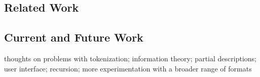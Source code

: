 \subsection{Related Work}

\subsection {Current and Future Work}

thoughts on problems with tokenization; information theory; partial
descriptions; user interface; recursion; more experimentation with a
broader range of formats
